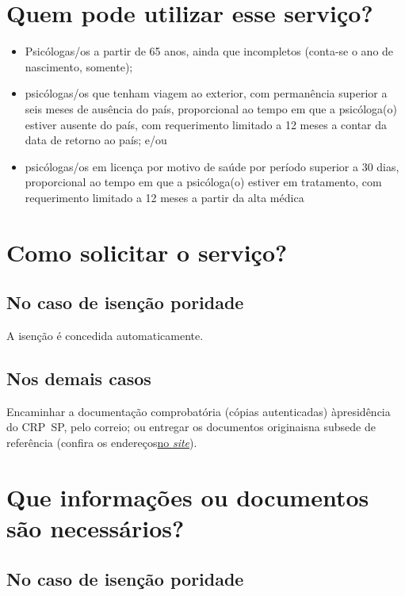 \section{Quem pode utilizar esse serviço?}

\begin{itemize}
  \item  Psicólogas/os a partir de 65 anos, ainda que incompletos (conta-se o  ano de nascimento, somente);
  \item  psicólogas/os que tenham viagem ao exterior, com permanência superior  a seis meses de ausência do país, proporcional ao tempo em que a  psicóloga(o) estiver ausente do país, com requerimento limitado a 12  meses a contar da data de retorno ao país; e/ou
  \item  psicólogas/os em licença por motivo de saúde por período superior a 30  dias, proporcional ao tempo em que a psicóloga(o) estiver em  tratamento, com requerimento limitado a 12 meses a partir da alta  médica
\end{itemize}

\section{Como solicitar o serviço?}

\subsection{No caso de isenção poridade}

A isenção é concedida automaticamente.

\subsection{Nos demais casos}

Encaminhar a documentação comprobatória (cópias autenticadas) àpresidência do CRP~SP, pelo correio; ou entregar os documentos originaisna subsede de referência (confira os endereços\href{https://www.crpsp.org/sede/index}{no \emph{site}}).

\section{Que informações ou documentos são necessários?}

\subsection{No caso de isenção poridade}

